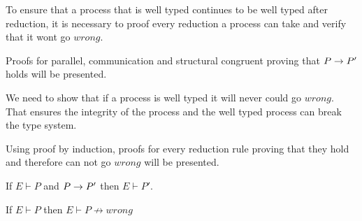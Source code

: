     To ensure that a process that is well typed continues to be well typed after reduction, it is necessary to proof every reduction a process can take and verify that it wont go $wrong$.

    Proofs for parallel, communication and structural congruent proving that $P \rightarrow P'$ holds will be presented.\\
\newpage

We need to show that if a process is well typed it will never could go $wrong$. That ensures the integrity of the process and the well typed process can break the type system.

Using proof by induction, proofs for every reduction rule proving that they hold and therefore can not go $wrong$ will be presented.
\begin{theorem}
	If $E \vdash P$ and $P\rightarrow P'$ then $E \vdash P'$.
\end{theorem}
\begin{theorem}
	If $E \vdash P$ then $E \vdash P \nrightarrow wrong$
\end{theorem}
